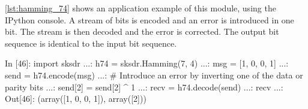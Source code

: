 \autoref{lst:hamming_74} shows an application example of this module, using the IPython console. A stream of bits is encoded and an error is introduced in one bit. The stream is then decoded and the error is corrected. The output bit sequence is identical to the input bit sequence.

\begin{python}[label={lst:hamming_74},caption={Hamming(7,4) example}]
In [46]: import sksdr
  ...: h74 = sksdr.Hamming(7, 4)
  ...: msg = [1, 0, 0, 1]
  ...: send = h74.encode(msg)
  ...: # Introduce an error by inverting one of the data or parity bits
  ...: send[2] = send[2] ^ 1
  ...: recv = h74.decode(send)
  ...: recv
  ...:
Out[46]: (array([1, 0, 0, 1]), array([2]))
\end{python}
